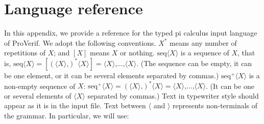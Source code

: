 \documentclass{book}
\newcommand{\nonterm}[1]{\langle\mathit{#1}\rangle}
\newcommand{\tblue}[1]{\textcolor{blue}{REMARK: \emph{#1}}}
\renewcommand{\marginpar}[1]{\tblue{#1}}
\newcommand{\seq}[1]{\textrm{seq}\nonterm{#1}}
\newcommand{\neseq}[1]{\textrm{seq}^+\nonterm{#1}}
\begin{document}

\appendix

\chapter{Language reference}\label{app:grammar}


In this appendix, we provide a reference for the typed pi calculus input language of ProVerif. We adopt the following conventions. $X^*$ means any number of repetitions of $X$; and $[X]$ means $X$ or nothing. $\seq{X}$ is a sequence of $X$, that is, $\seq{X} = [(\nonterm{X}\texttt{,})^*\nonterm{X}] = \nonterm{X}\texttt{,}\ldots\texttt{,}\nonterm{X}$.
(The sequence can be empty, it can be one element, or it can be several elements separated by commas.)
$\neseq{X}$ is a non-empty sequence of $X$: $\neseq{X} = (\nonterm{X}\texttt{,})^*\nonterm{X} = \nonterm{X}\texttt{,}\ldots\texttt{,}\nonterm{X}$.
(It can be one or several elements of $\nonterm{X}$ separated by commas.)
Text in typewriter style should appear as it is in the input file. Text between $\langle$ and $\rangle$ represents non-terminals of the grammar. In particular, we will use:
\end{document}
